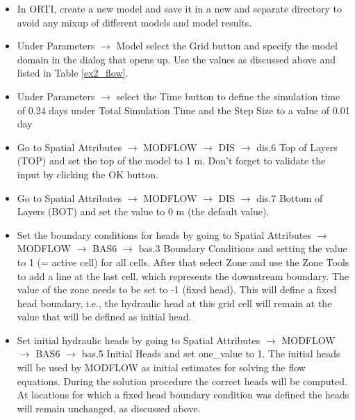 \begin{itemize} 

\item In ORTI, create a new model and save it in a new and separate directory
to avoid any mixup of different models and model results.

\item Under {\color{blue}Parameters} $\rightarrow$ {\color{blue}Model} select the {\color{blue}Grid} button and specify the model domain in the dialog that opens up. Use the values as discussed above 
and listed in Table \ref{ex2_flow}.

\item Under {\color{blue}Parameters} $\rightarrow$ select the {\color{blue}Time} button to define the simulation time of 0.24 days under {\color{blue}Total Simulation Time} and the {\color{blue}Step Size} 
to a value of 0.01 day

\item Go to {\color{blue}Spatial Attributes} $\rightarrow$ {\color{blue}MODFLOW} $\rightarrow$ {\color{blue}DIS} $\rightarrow$ {\color{blue}dis.6 Top of Layers (TOP)} and set the top of the model to 1 m. Don't forget to validate the input by clicking the {\color{blue}OK} button.

\item Go to {\color{blue}Spatial Attributes} $\rightarrow$ {\color{blue}MODFLOW} $\rightarrow$ {\color{blue}DIS} $\rightarrow$ {\color{blue}dis.7 Bottom of Layers (BOT)} and set the value to 0 m (the default value).

\item Set the boundary conditions for heads by going to {\color{blue}Spatial Attributes} $\rightarrow$ {\color{blue}MODFLOW} $\rightarrow$ {\color{blue}BAS6} $\rightarrow$ {\color{blue}bas.3 Boundary Conditions} and setting the value to 1 (= active cell) for all cells. After that select {\color{blue}Zone} and use the {\color{blue}Zone Tools} to add a line at the last cell, which represents the downstream boundary. The value of the zone needs to be set to -1 (fixed head). This will define a fixed head boundary, i.e., the hydraulic head at this grid cell will remain at the value that will be defined as initial head. 

\item Set initial hydraulic heads by going to {\color{blue}Spatial Attributes} 
$\rightarrow$ {\color{blue}MODFLOW} $\rightarrow$ {\color{blue}BAS6} 
$\rightarrow$ {\color{blue}bas.5 Initial Heads} and set {\color{blue}one\_value} to 1. 
The initial heads will be used by MODFLOW as initial estimates for solving the flow equations. 
During the solution procedure the correct heads will be computed. 
At locations for which a fixed head boundary condition was defined the heads 
will remain unchanged, as discussed above. 


\end{itemize}
